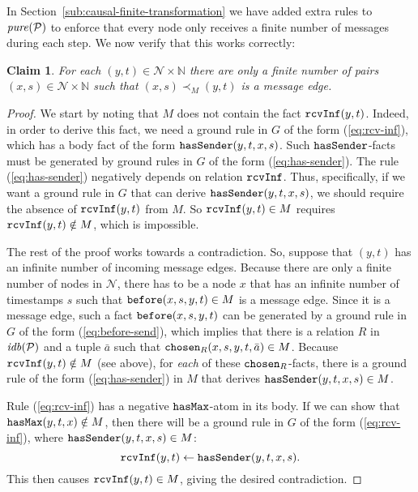 \documentclass{tlp}
\newtheorem{claim}[theorem]{Claim}
\newcommand{\Nat}{\mathbb{N}}  \newcommand{\len}[1]{|#1|} \newcommand{\rom}[1]{\text{\emph{(#1)}}} \newcommand{\romI}{\rom i}
\newcommand{\ded}{\mathcal{P}}
\newcommand{\idb}[1]{\fname{idb}(#1)}
\newcommand{\nw}{\mathcal{N}}
\newcommand{\before}{\pred{before}}
\newcommand{\chosen}{\pred{chosen}}
\newcommand{\rcvinf}{\pred{rcvInf}}
\newcommand{\hasmax}{\pred{hasMax}}
\newcommand{\hassender}{\pred{hasSender}}
\newcommand{\pure}[1]{\fname{pure}(#1)}
\newcommand{\nwnat}{\nw\times\Nat}
\newcommand{\grded}{G}
\newcommand{\cauM}{\prec_{M}}
\begin{document}
In Section~\ref{sub:causal-finite-transformation} we have added
extra rules to $\pure{\ded}$ to enforce that every node only receives
a finite number of messages during each step. We now verify that this
works correctly:

\begin{claim}\label{claim:finite-message-edges}For each $(y,t)\in\nwnat$
there are only a finite number of pairs $(x,s)\in\nwnat$ such that
$(x,s)\cauM(y,t)$ is a message edge.\end{claim}

\begin{proof}

We start by noting that $M$ does not contain the fact $\rcvinf(y,t)$.
Indeed, in order to derive this fact, we need a ground rule in $\grded$
of the form (\ref{eq:rcv-inf}), which has a body fact of the form
$\hassender(y,t,x,s)$. Such $\hassender$-facts must be generated
by ground rules in $\grded$ of the form (\ref{eq:has-sender}). The
rule (\ref{eq:has-sender}) negatively depends on relation $\rcvinf$.
Thus, specifically, if we want a ground rule in $\grded$ that can
derive $\hassender(y,t,x,s)$, we should require the absence of $\rcvinf(y,t)$
from $M$. So $\rcvinf(y,t)\in M$ requires $\rcvinf(y,t)\notin M$,
which is impossible.

The rest of the proof works towards a contradiction. So, suppose that
$(y,t)$ has an infinite number of incoming message edges. Because
there are only a finite number of nodes in $\nw$, there has to be
a node $x$ that has an infinite number of timestamps $s$ such that
$\before(x,s,y,t)\in M$ is a message edge. Since it is a message
edge, such a fact $\before(x,s,y,t)$ can be generated by a ground
rule in $\grded$ of the form (\ref{eq:before-send}), which implies
that there is a relation $R$ in $\idb{\ded}$ and a tuple $\bar{a}$
such that $\chosen_{R}(x,s,y,t,\bar{a})\in M$. Because $\rcvinf(y,t)\notin M$
(see above), for \emph{each} of these $\chosen_{R}$-facts, there
is a ground rule of the form (\ref{eq:has-sender}) in $M$ that derives
$\hassender(y,t,x,s)\in M$. 

Rule (\ref{eq:rcv-inf}) has a negative $\hasmax$-atom in its body.
If we can show that $\hasmax(y,t,x)\notin M$, then there will be
a ground rule in $\grded$ of the form (\ref{eq:rcv-inf}), where
$\hassender(y,t,x,s)\in M$:
\[
\rcvinf(y,t)\gets\hassender(y,t,x,s).
\]
This then causes $\rcvinf(y,t)\in M$, giving the desired contradiction.
 


\end{proof}
\end{document}
